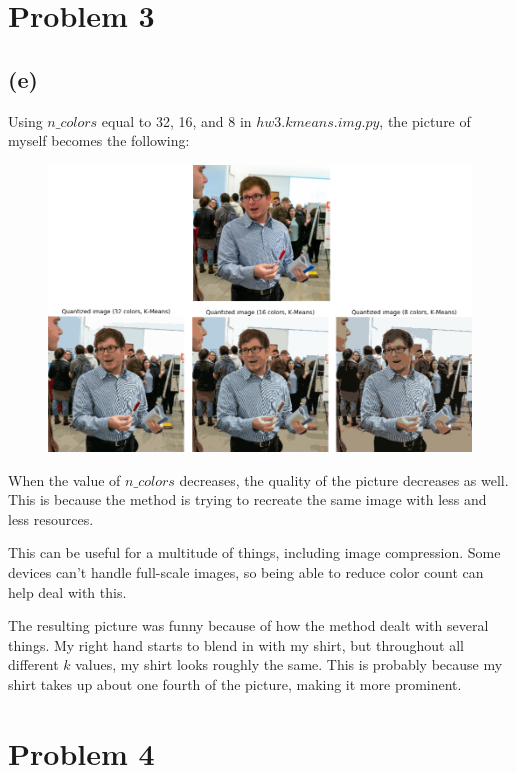 \documentclass[a4paper]{article}
\begin{document}
\newpage

\section{Problem 3}
\subsection{(e)}
Using $n\_colors$ equal to 32, 16, and 8 in $hw3.kmeans.img.py$, the picture of myself becomes the following:


\begin{figure}[h]
  \begin{center}
    \includegraphics[width=160mm,scale=1]{picsOfMe.png}
  \end{center}
\end{figure}


When the value of $n\_colors$ decreases, the quality of the picture decreases as well. This is because the method is trying to recreate the same image with less and less resources.


This can be useful for a multitude of things, including image compression. Some devices can't handle full-scale images, so being able to reduce color count can help deal with this.


The resulting picture was funny because of how the method dealt with several things. My right hand starts to blend in with my shirt, but throughout all different $k$ values, my shirt looks roughly the same. This is probably because my shirt takes up about one fourth of the picture, making it more prominent.

\newpage

\section{Problem 4}
\end{document}
